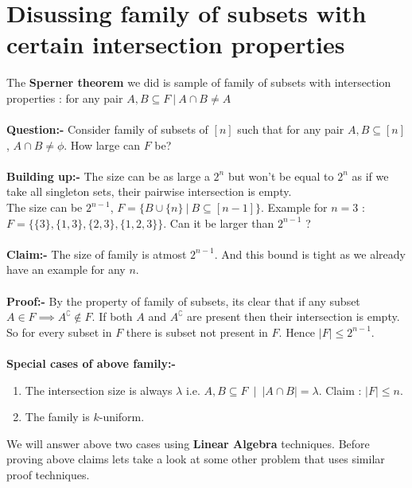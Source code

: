 \section{Disussing family of subsets with certain intersection properties}
The \textbf{Sperner theorem} we did is sample of family of subsets with intersection properties : for any pair $A,B \subseteq F ~|~ A\cap B \neq A$\\\\
\textbf{Question:-} Consider  family of subsets of $[n]$ such that for any pair $A,B \subseteq [n]$, $A \cap B \neq \phi$. How large can $F$ be?\\\\
\textbf{Building up:-} The size can be as large a $2^n$ but won't be equal to $2^n$ as if we take all singleton sets, their pairwise intersection is empty.\\ The size can be $2^{n-1}$, $F = \{ B \cup \{n\}~ | ~B\subseteq[n-1] \}$. Example for $n=3$ : $F=\{\{3\},\{1,3\},\{2,3\},\{1,2,3\}\}$. Can it be larger than $2^{n-1}$ ?\\\\
\textbf{Claim:-} The size of family is atmost $2^{n-1}$. And this bound is tight as we already have an example for any $n$.\\\\
\textbf{Proof:-} By the property of family of subsets, its clear that if any subset $A \in F \implies {A}^\complement \notin F$. If both $A$ and $A^\complement$ are present then their intersection is empty. So for every subset in $F$ there is subset not present in $F$. Hence $|F| \le 2^{n-1}$.\\\\
\textbf{Special cases of above family:-}
\begin{enumerate}
\item The intersection size is always $\lambda$ i.e. $A,B \subseteq F ~ \mid ~ |A \cap B|=\lambda$. Claim : $|F|\le n$.
\item The family is $k$-uniform.
\end{enumerate}
We will answer above two cases using \textbf{Linear Algebra} techniques. Before proving above claims lets take a look at some other problem that uses similar proof techniques.

